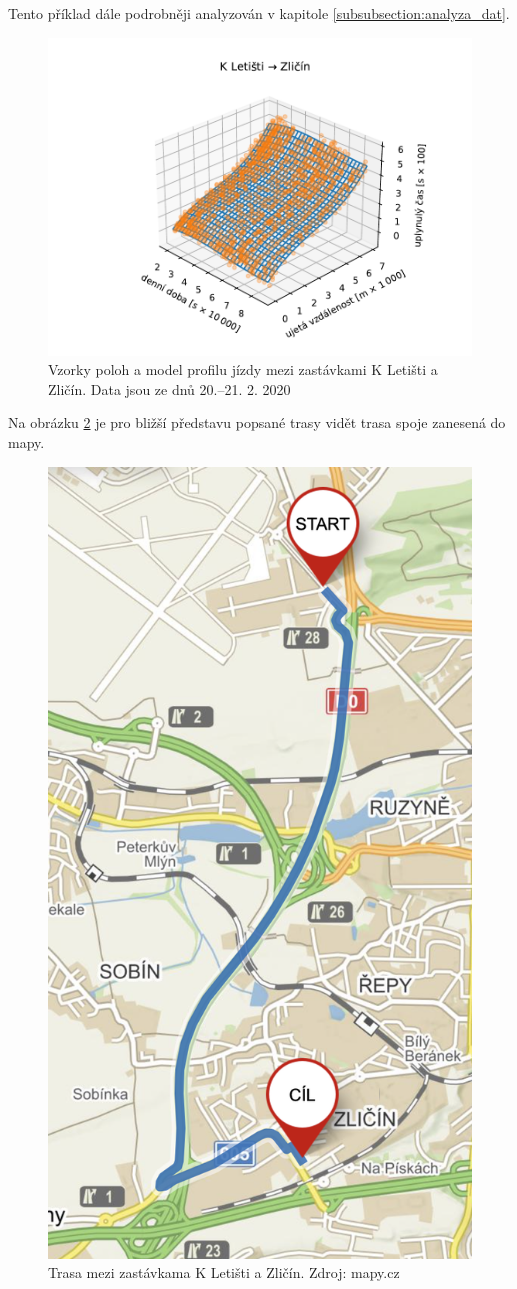 \bigbreak

Tento příklad dále podrobněji analyzován v kapitole \ref{subsubsection:analyza_dat}.

\begin{figure}
  \includegraphics[width=\linewidth]{../img/534_421}
  \caption{Vzorky poloh a model profilu jízdy mezi zastávkami K Letišti a Zličín. Data jsou ze dnů 20.--21. 2. 2020}
  \label{fig:k_letisti_to_zlicin_3d}
\end{figure}

\bigbreak

Na obrázku \ref{fig:k_letisti_to_zlicin_map} je pro bližší představu popsané trasy vidět trasa spoje zanesená do mapy.

\begin{figure}
	\centering
  \includegraphics[width=0.3\linewidth]{../img/k_letisti_to_zlicin_map.png}
  \caption{Trasa mezi zastávkama K Letišti a Zličín. Zdroj: mapy.cz}
  \label{fig:k_letisti_to_zlicin_map}
\end{figure}

